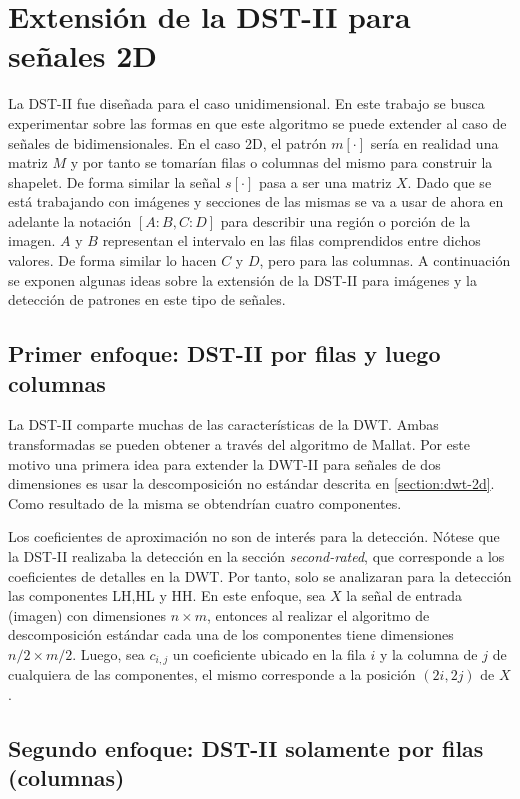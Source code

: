 \section{Extensión de la DST-II para señales 2D}\label{section:2d}

La DST-II fue diseñada para el caso unidimensional. En este trabajo se busca experimentar sobre las formas en que
este algoritmo se puede extender al caso de señales de bidimensionales. 
En el caso 2D, el patrón $m[\cdot]$ sería en realidad
una matriz $M$ y por tanto se tomarían filas o columnas del mismo para construir la shapelet.
De forma similar la señal $s[\cdot]$ pasa a ser una matriz $X$.
Dado que se está trabajando con imágenes y secciones de las mismas se va a usar de ahora en adelante la notación
$[A:B,C:D]$ para describir una región o porción de la imagen. $A$ y $B$ representan el intervalo en las filas
comprendidos entre dichos valores. De forma similar lo hacen $C$ y $D$, pero para las columnas.
A continuación se exponen algunas ideas sobre la extensión de la DST-II para imágenes y la detección de patrones en este tipo de señales.

\subsection{Primer enfoque: DST-II por filas y luego columnas}

La DST-II comparte muchas de las características de la DWT. Ambas transformadas se pueden obtener a través del
algoritmo de Mallat. Por este motivo una primera idea para extender la DWT-II para señales de dos dimensiones
es usar la descomposición no estándar descrita en \ref{section:dwt-2d}.
Como resultado de la misma se obtendrían cuatro componentes. 

Los coeficientes de aproximación no son de interés para la detección. Nótese que la DST-II realizaba la detección en la sección
\textit{second-rated}, que corresponde a los coeficientes de detalles en la DWT. Por tanto, solo se analizaran para
la detección las componentes LH,HL y HH.
En este enfoque, sea $X$ la señal de entrada (imagen) con dimensiones $n\times m$, entonces al realizar el algoritmo de descomposición estándar
cada una de los componentes tiene dimensiones $n/2 \times m/2$. Luego, sea $c_{i,j}$ un coeficiente
ubicado en la fila $i$ y la columna de $j$ de cualquiera de las componentes, el mismo corresponde
a la posición $(2i,2j)$ de $X$.

\subsection{Segundo enfoque: DST-II solamente por filas (columnas)}

